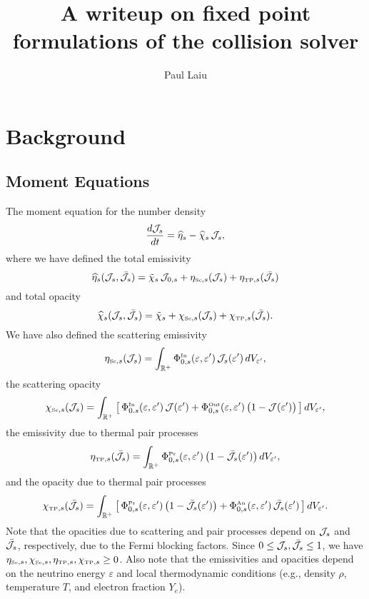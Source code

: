 \documentclass[12pt]{article}
\newcommand{\IN}{\mbox{\tiny In}}
\newcommand{\PROD}{\mbox{\tiny Pr}}
\newcommand{\ANN}{\mbox{\tiny An}}
\newcommand{\SC}{\mbox{\tiny Sc}}      %
\newcommand{\TP}{\mbox{\tiny TP}}      %
\begin{document}
\title{A writeup on fixed point formulations of the collision solver}
\author{Paul Laiu}

\maketitle

\section{Background}
\subsection{Moment Equations}
The moment equation for the number density
\begin{equation}
  \frac{d \mathcal{J}_{s}}{d t}
  =\widehat{\eta}_{s} - \widehat{\chi}_{s}\,\mathcal{J}_{s},
  \label{eq:momentNumber}
\end{equation}
where we have defined the total emissivity 
\begin{equation}
  \widehat{\eta}_{s}(\cJ_{s},\bar{\cJ}_{s})
  =\tilde{\chi}_{s}\,\cJ_{0,s} + \eta_{\SC,s}(\cJ_{s}) + \eta_{\TP,s}(\bar{\cJ}_{s})
\end{equation}
and total opacity
\begin{equation}
  \widehat{\chi}_{s}(\cJ_{s},\bar{\cJ}_{s})
  =\tilde{\chi}_{s} + \chi_{\SC,s}(\cJ_{s}) + \chi_{\TP,s}(\bar{\cJ}_{s}).  
\end{equation}
We have also defined the scattering emissivity
\begin{equation}
  \eta_{\SC,s}(\cJ_{s})
  =\int_{\bbR^{+}}\Phi_{0,s}^{\IN}(\varepsilon,\varepsilon')\,\cJ_{s}(\varepsilon')\,dV_{\varepsilon'},
\end{equation}
the scattering opacity
\begin{equation}
  \chi_{\SC,s}(\cJ_{s})
  =\int_{\bbR^{+}}\big[\,\Phi_{0.s}^{\IN}(\varepsilon,\varepsilon')\,\cJ(\varepsilon')+\Phi_{0,s}^{\Out}(\varepsilon,\varepsilon')\,\big(1-\cJ(\varepsilon')\big)\,\big]\,dV_{\varepsilon'},
\end{equation}
the emissivity due to thermal pair processes
\begin{equation}
  \eta_{\TP,s}(\bar{\cJ}_{s})
  =\int_{\bbR^{+}}\Phi_{0,s}^{\PROD}(\varepsilon,\varepsilon')\,\big(1-\bar{\cJ}_{s}(\varepsilon')\big)\,dV_{\varepsilon'},
\end{equation}
and the opacity due to thermal pair processes
\begin{equation}
  \chi_{\TP,s}(\bar{\cJ}_{s})
  =\int_{\bbR^{+}}\big[\,\Phi_{0,s}^{\PROD}(\varepsilon,\varepsilon')\,\big(1-\bar{\cJ}_{s}(\varepsilon')\big)+\Phi_{0,s}^{\ANN}(\varepsilon,\varepsilon')\,\bar{\cJ}_{s}(\varepsilon')\,\big]\,dV_{\varepsilon'}.  
\end{equation}
Note that the opacities due to scattering and pair processes depend on $\mathcal{J}_{s}$ and $\bar{\mathcal{J}}_{s}$, respectively, due to the Fermi blocking factors.  
Since $0\le\mathcal{J}_{s},\bar{\mathcal{J}}_{s}\le1$, we have $\eta_{\SC,s},\chi_{\SC,s},\eta_{\TP,s},\chi_{\TP,s}\ge0$.  
Also note that the emissivities and opacities depend on the neutrino energy $\varepsilon$ and local thermodynamic conditions (e.g., density $\rho$, temperature $T$, and electron fraction $Y_{e}$).  
\end{document}
